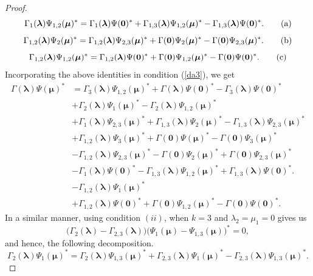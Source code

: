 \documentclass[10pt,a4paper]{amsart}
\begin{document}
\begin{proof}
\[
\Gamma_1(\bm{\lambda})\Psi_{1,2}(\bm{\mu})^* =  \Gamma_1(\bm{\lambda}) \Psi(\bm{0})^* +  \Gamma_{1,3}(\bm{\lambda}) \Psi_{1,2}(\bm{\mu})^* - \Gamma_{1,3}(\bm{\lambda}) \Psi(\bm{0})^*. \tag{\text{a}}
\]
\[
\Gamma_{1,2}(\bm{\lambda}) \Psi_{2}(\bm{\mu})^* =   \Gamma_{1,2}(\bm{\lambda}) \Psi_{2,3}(\bm{\mu})^* + \Gamma(\bm{0}) \Psi_{2}(\bm{\mu})^* - \Gamma(\bm{0}) \Psi_{2,3}(\bm{\mu})^*. \tag{\text{b}}
\]
\[
\Gamma_{1,2}(\bm{\lambda})  \Psi_{1,2}(\bm{\mu})^* = \Gamma_{1,2}(\bm{\lambda}) \Psi(\bm{0})^* + \Gamma(\bm{0}) \Psi_{1,2}(\bm{\mu})^* - \Gamma(\bm{0}) \Psi(\bm{0})^*. \tag{\text{c}}
\]
Incorporating the above identities in condition (\ref{da3}), we get
\begin{equation}\label{da4}
\begin{split}
\Gamma(\bm{\lambda})  \Psi(\bm{\mu})^* &=  \Gamma_3(\bm{\lambda}) \Psi_{1,2}(\bm{\mu})^* + \Gamma(\bm{\lambda}) \Psi(\bm{0})^* - \Gamma_3(\bm{\lambda}) \Psi(\bm{0})^* \\
&+ \Gamma_2(\bm{\lambda}) \Psi_1(\bm{\mu})^* - \Gamma_2(\bm{\lambda}) \Psi_{1,2}(\bm{\mu})^* \\
&+ \Gamma_1(\bm{\lambda})  \Psi_{2,3}(\bm{\mu})^* +  \Gamma_{1,3}(\bm{\lambda}) \Psi_{2}(\bm{\mu})^* - \Gamma_{1,3}(\bm{\lambda}) \Psi_{2,3}(\bm{\mu})^* \\
&+ \Gamma_{1,2}(\bm{\lambda})\Psi_{3}(\bm{\mu})^* + \Gamma(\bm{0})\Psi(\bm{\mu})^* - \Gamma(\bm{0})  \Psi_{3}(\bm{\mu})^*\\
&- \Gamma_{1,2}(\bm{\lambda}) \Psi_{2,3}(\bm{\mu})^* - \Gamma(\bm{0}) \Psi_{2}(\bm{\mu})^* + \Gamma(\bm{0}) \Psi_{2,3}(\bm{\mu})^* \\
&- \Gamma_1(\bm{\lambda}) \Psi(\bm{0})^* - \Gamma_{1,3}(\bm{\lambda}) \Psi_{1,2}(\bm{\mu})^* + \Gamma_{1,3}(\bm{\lambda}) \Psi(\bm{0})^*.\\
&- \Gamma_{1,2}(\bm{\lambda})  \Psi_{1}(\bm{\mu})^* \\
&+ \Gamma_{1,2}(\bm{\lambda}) \Psi(\bm{0})^* + \Gamma(\bm{0}) \Psi_{1,2}(\bm{\mu})^* - \Gamma(\bm{0}) \Psi(\bm{0})^*.
\end{split}
\end{equation}
In a similar manner, using condition $(ii)$, when $k=3$ and $\lambda_2 = \mu_1 = 0$ gives us 
\[
\big( \Gamma_{2}(\bm{\lambda}) - \Gamma_{2,3}(\bm{\lambda}) \big) \big( \Psi_1(\bm{\mu}) - \Psi_{1,3}(\bm{\mu}) \big)^* = 0,
\]
and hence,  the following decomposition.
\[
\Gamma_2(\bm{\lambda}) \Psi_{1}(\bm{\mu})^* =  \Gamma_2(\bm{\lambda})\Psi_{1,3}(\bm{\mu})^* + \Gamma_{2,3}(\bm{\lambda}) \Psi_{1}(\bm{\mu})^* - \Gamma_{2,3}(\bm{\lambda}) \Psi_{1,3}(\bm{\mu})^*. 
\]
\end{proof}
\end{document}
